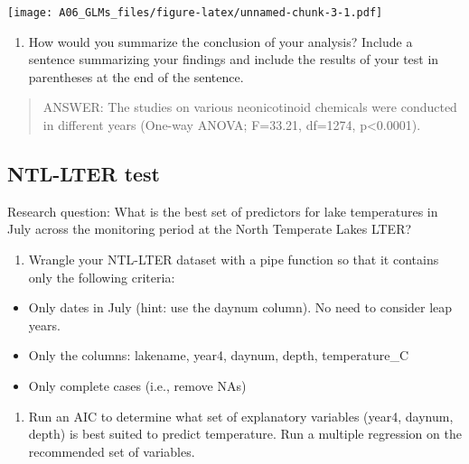 \documentclass[]{article}
\providecommand{\tightlist}{%
  \setlength{\itemsep}{0pt}\setlength{\parskip}{0pt}}
\begin{document}
\texttt{[image: A06\_GLMs\_files/figure-latex/unnamed-chunk-3-1.pdf]}

\begin{enumerate}
\def\labelenumi{\arabic{enumi}.}
\setcounter{enumi}{8}
\tightlist
\item
  How would you summarize the conclusion of your analysis? Include a
  sentence summarizing your findings and include the results of your
  test in parentheses at the end of the sentence.
\end{enumerate}

\begin{quote}
ANSWER: The studies on various neonicotinoid chemicals were conducted in
different years (One-way ANOVA; F=33.21, df=1274, p\textless{}0.0001).
\end{quote}

\subsection{NTL-LTER test}\label{ntl-lter-test}

Research question: What is the best set of predictors for lake
temperatures in July across the monitoring period at the North Temperate
Lakes LTER?

\begin{enumerate}
\def\labelenumi{\arabic{enumi}.}
\setcounter{enumi}{10}
\tightlist
\item
  Wrangle your NTL-LTER dataset with a pipe function so that it contains
  only the following criteria:
\end{enumerate}

\begin{itemize}
\tightlist
\item
  Only dates in July (hint: use the daynum column). No need to consider
  leap years.
\item
  Only the columns: lakename, year4, daynum, depth, temperature\_C
\item
  Only complete cases (i.e., remove NAs)
\end{itemize}

\begin{enumerate}
\def\labelenumi{\arabic{enumi}.}
\setcounter{enumi}{11}
\tightlist
\item
  Run an AIC to determine what set of explanatory variables (year4,
  daynum, depth) is best suited to predict temperature. Run a multiple
  regression on the recommended set of variables.
\end{enumerate}
\end{document}
